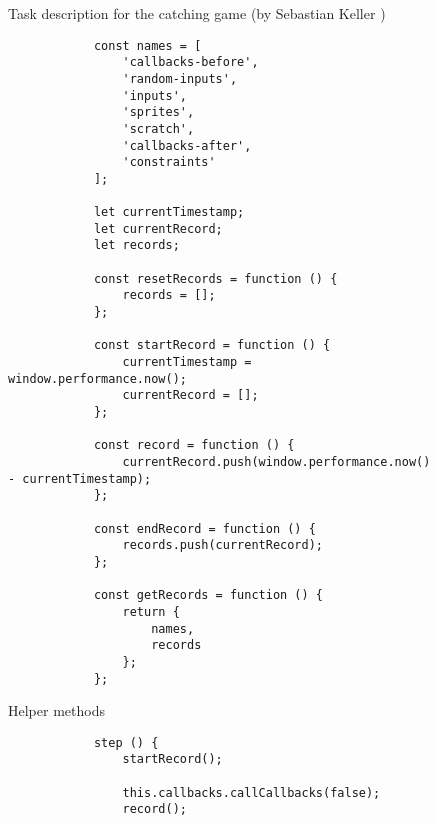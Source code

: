 \begin{figure}[htpb]
    \centering
    \caption{Task description for the catching game (by Sebastian Keller \cite{keller})}
    \label{fig:catching_game_task_description}
\end{figure}

\begin{listing}
    \centering

    \begin{subfigure}[b]{.40\textwidth}
        \begin{verbatim}
            const names = [
                'callbacks-before',
                'random-inputs',
                'inputs',
                'sprites',
                'scratch',
                'callbacks-after',
                'constraints'
            ];

            let currentTimestamp;
            let currentRecord;
            let records;

            const resetRecords = function () {
                records = [];
            };

            const startRecord = function () {
                currentTimestamp = window.performance.now();
                currentRecord = [];
            };

            const record = function () {
                currentRecord.push(window.performance.now() - currentTimestamp);
            };

            const endRecord = function () {
                records.push(currentRecord);
            };

            const getRecords = function () {
                return {
                    names,
                    records
                };
            };
        \end{verbatim}
        \vspace{-\bigskipamount}
        \caption{Helper methods}
    \end{subfigure}
    \hspace{.08\textwidth}
    \begin{subfigure}[b]{.40\textwidth}
        \begin{verbatim}
            step () {
                startRecord();

                this.callbacks.callCallbacks(false);
                record();


\end{verbatim}
\end{subfigure}
\end{listing}
